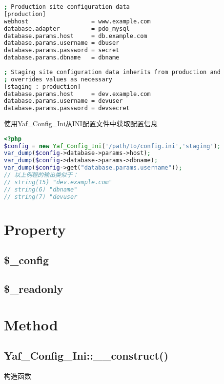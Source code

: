 \begin{lstlisting}[language=bash]
; Production site configuration data
[production]
webhost                  = www.example.com
database.adapter         = pdo_mysql
database.params.host     = db.example.com
database.params.username = dbuser
database.params.password = secret
database.params.dbname   = dbname
 
; Staging site configuration data inherits from production and
; overrides values as necessary
[staging : production]
database.params.host     = dev.example.com
database.params.username = devuser
database.params.password = devsecret
\end{lstlisting}



\begin{example}
使用Yaf\_Config\_Ini从INI配置文件中获取配置信息
\begin{lstlisting}[language=PHP]
<?php
$config = new Yaf_Config_Ini('/path/to/config.ini','staging');
var_dump($config->database->params->host); 
var_dump($config->database->params->dbname);
var_dump($config->get("database.params.username"));
// 以上例程的输出类似于：
// string(15) "dev.example.com"
// string(6) "dbname"
// string(7) "devuser
\end{lstlisting}
\end{example}


\section{Property}

\subsection{\$\_config}



\subsection{\$\_readonly}


\section{Method}


\subsection{Yaf\_Config\_Ini::\_\_construct()}


构造函数




